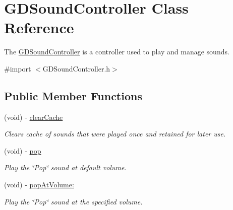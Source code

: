 \hypertarget{interface_g_d_sound_controller}{
\section{GDSoundController Class Reference}
\label{interface_g_d_sound_controller}
}


The \hyperlink{interface_g_d_sound_controller}{GDSoundController} is a controller used to play and manage sounds.  


{\ttfamily \#import $<$GDSoundController.h$>$}\subsection*{Public Member Functions}
\begin{DoxyCompactItemize}
\item 
\hypertarget{interface_g_d_sound_controller_a1020b0b1338ec729ff9e48323e7acba4}{
(void) -\/ \hyperlink{interface_g_d_sound_controller_a1020b0b1338ec729ff9e48323e7acba4}{clearCache}}
\label{interface_g_d_sound_controller_a1020b0b1338ec729ff9e48323e7acba4}

\begin{DoxyCompactList}\small\item\em Clears cache of sounds that were played once and retained for later use. \item\end{DoxyCompactList}\item 
\hypertarget{interface_g_d_sound_controller_a009c1e9ecced1205b51df6fe76917a43}{
(void) -\/ \hyperlink{interface_g_d_sound_controller_a009c1e9ecced1205b51df6fe76917a43}{pop}}
\label{interface_g_d_sound_controller_a009c1e9ecced1205b51df6fe76917a43}

\begin{DoxyCompactList}\small\item\em Play the \char`\"{}Pop\char`\"{} sound at default volume. \item\end{DoxyCompactList}\item 
(void) -\/ \hyperlink{interface_g_d_sound_controller_a4dbc2b7f0f5b95d0639f986aee05390b}{popAtVolume:}
\begin{DoxyCompactList}\small\item\em Play the \char`\"{}Pop\char`\"{} sound at the specified volume. \item\end{DoxyCompactList}\end{DoxyCompactItemize}
